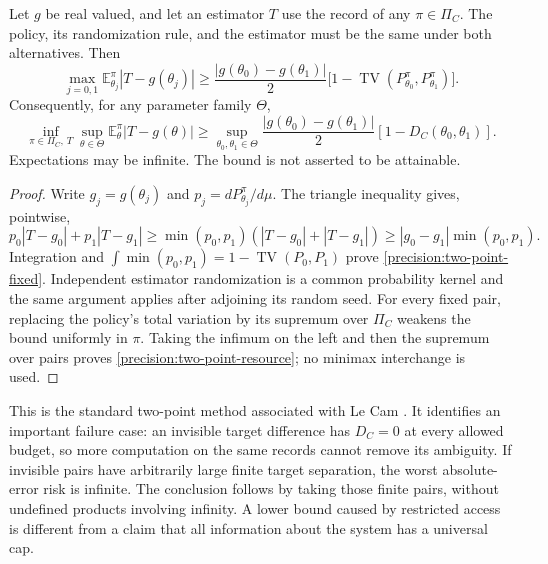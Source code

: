 \begin{proposition}
\label{precision:two-point}
Let $g$ be real valued, and let an estimator $T$ use the record of any
$\pi\in\Pi_C$. The policy, its randomization rule, and the estimator must be the
same under both alternatives. Then
\begin{equation}
 \max_{j=0,1}\mathbb E_{\theta_j}^{\pi}|T-g(\theta_j)|
 \geq \frac{|g(\theta_0)-g(\theta_1)|}{2}
 \bigl[1-\operatorname{TV}(P_{\theta_0}^\pi,P_{\theta_1}^\pi)\bigr].
 \label{precision:two-point-fixed}
\end{equation}
Consequently, for any parameter family $\Theta$,
\begin{equation}
 \inf_{\pi\in\Pi_C,\,T}\sup_{\theta\in\Theta}
 \mathbb E_\theta^\pi|T-g(\theta)|
 \geq \sup_{\theta_0,\theta_1\in\Theta}
 \frac{|g(\theta_0)-g(\theta_1)|}{2}
 [1-D_C(\theta_0,\theta_1)].
 \label{precision:two-point-resource}
\end{equation}
Expectations may be infinite. The bound is not asserted to be attainable.
\end{proposition}
\begin{proof}
Write $g_j=g(\theta_j)$ and $p_j=dP_{\theta_j}^\pi/d\mu$. The triangle inequality
gives, pointwise,
\[
 p_0|T-g_0|+p_1|T-g_1|
 \geq\min(p_0,p_1)(|T-g_0|+|T-g_1|)
 \geq |g_0-g_1|\min(p_0,p_1).
\]
Integration and $\int\min(p_0,p_1)=1-\operatorname{TV}(P_0,P_1)$ prove
\eqref{precision:two-point-fixed}. Independent estimator randomization is a
common probability kernel and the same argument applies after adjoining its
random seed. For every fixed pair, replacing the policy's total variation by
its supremum over $\Pi_C$ weakens the bound uniformly in $\pi$. Taking the
infimum on the left and then the supremum over pairs proves
\eqref{precision:two-point-resource}; no minimax interchange is used.
\end{proof}

This is the standard two-point method associated with Le Cam
\cite{caLeCamYang2000}. It identifies an important failure case: an invisible
target difference has $D_C=0$ at every allowed budget, so more computation on
the same records cannot remove its ambiguity. If invisible pairs have arbitrarily
large finite target separation, the worst absolute-error risk is infinite.
The conclusion follows by taking those finite pairs, without undefined products
involving infinity. A lower bound caused by restricted access is different from
a claim that all information about the system has a universal cap.

